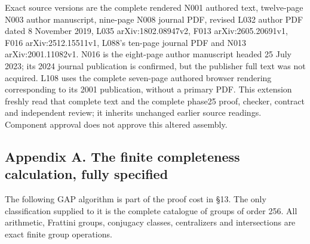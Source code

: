 \documentclass[
  10pt,
  letterpaper,
]{article}
\begin{document}
Exact source versions are the complete rendered N001 authored text,
twelve-page N003 author manuscript, nine-page N008 journal PDF, revised
L032 author PDF dated 8 November 2019, L035 arXiv:1802.08947v2, F013
arXiv:2605.20691v1, F016 arXiv:2512.15511v1, L088's ten-page journal PDF
and N013 arXiv:2001.11082v1. N016 is the eight-page author manuscript
headed 25 July 2023; its 2024 journal publication is confirmed, but the
publisher full text was not acquired. L108 uses the complete seven-page
authored browser rendering corresponding to its 2001 publication,
without a primary PDF. This extension freshly read that complete text
and the complete phase25 proof, checker, contract and independent
review; it inherits unchanged earlier source readings. Component
approval does not approve this altered assembly.

\subsection{Appendix A. The finite completeness calculation, fully
specified}\label{appendix-a.-the-finite-completeness-calculation-fully-specified}

The following GAP algorithm is part of the proof cost in §13. The only
classification supplied to it is the complete catalogue of groups of
order 256. All arithmetic, Frattini groups, conjugacy classes,
centralizers and intersections are exact finite group operations.
\end{document}

